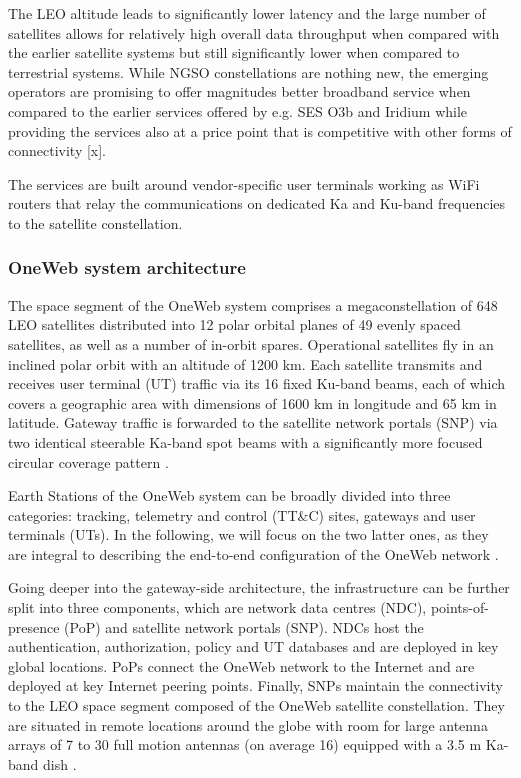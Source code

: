 \documentclass[english, 12pt, a4paper, elec, utf8, a-1b, online]{aaltothesis}
\begin{document}
The LEO altitude leads to significantly lower latency and the large number of satellites allows for relatively high overall data throughput when compared with the earlier satellite systems but still significantly lower when compared to terrestrial systems.
While NGSO constellations are nothing new, the emerging operators are promising to offer magnitudes better broadband service when compared to the earlier services offered by e.g.
SES O3b and Iridium while providing the services also at a price point that is competitive with other forms of connectivity [x].

The services are built around vendor-specific user terminals working as WiFi routers that relay the communications on dedicated Ka and Ku-band frequencies to the satellite constellation.

\subsubsection{OneWeb system architecture} \label{ch-oneweb}

The space segment of the OneWeb system comprises a megaconstellation of 648 LEO satellites distributed into 12 polar orbital planes of 49 evenly spaced satellites, as well as a number of in-orbit spares. 
Operational satellites fly in an inclined polar orbit with an altitude of 1200 km.
Each satellite transmits and receives user terminal (UT) traffic via its 16 fixed Ku-band beams, each of which covers a geographic area with dimensions of 1600 km in longitude and 65 km in latitude.
Gateway traffic is forwarded to the satellite network portals (SNP) via two identical steerable Ka-band spot beams with a significantly more focused circular coverage pattern \cite{henri2020oneweb, worldvu2016loi}.

Earth Stations of the OneWeb system can be broadly divided into three categories: tracking, telemetry and control (TT\&C) sites,  gateways and user terminals (UTs).
In the following, we will focus on the two latter ones, as they are integral to describing the end-to-end configuration of the OneWeb network \cite{worldvu2016loi}.

Going deeper into the gateway-side architecture, the infrastructure can be further split into three components, which are network data centres (NDC), points-of-presence (PoP) and satellite network portals (SNP).
NDCs host the authentication, authorization, policy and UT databases and are deployed in key global locations.
PoPs connect the OneWeb network to the Internet and are deployed at key Internet peering points.
Finally, SNPs maintain the connectivity to the LEO space segment composed of the OneWeb satellite constellation.
They are situated in remote locations around the globe with room for large antenna arrays of 7 to 30 full motion antennas (on average 16) equipped with a 3.5 m Ka-band dish \cite{henri2020oneweb}.
\end{document}
